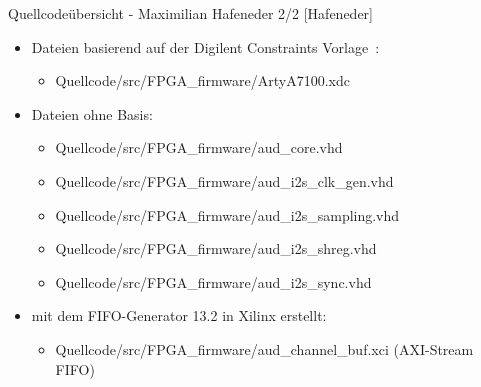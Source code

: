 \begin{frame}{Quellcodeübersicht - Maximilian Hafeneder 2/2 [Hafeneder]}
    \begin{itemize}
        \item Dateien basierend auf der Digilent Constraints Vorlage~\cite{digilent_artya7_100_constraints}:
            \begin{itemize}
                \item Quellcode/src/FPGA\_firmware/ArtyA7100.xdc
            \end{itemize}
        \item Dateien ohne Basis:
            \begin{itemize}
                \item Quellcode/src/FPGA\_firmware/aud\_core.vhd
                \item Quellcode/src/FPGA\_firmware/aud\_i2s\_clk\_gen.vhd
                \item Quellcode/src/FPGA\_firmware/aud\_i2s\_sampling.vhd
                \item Quellcode/src/FPGA\_firmware/aud\_i2s\_shreg.vhd
                \item Quellcode/src/FPGA\_firmware/aud\_i2s\_sync.vhd
            \end{itemize}
        \item mit dem FIFO-Generator 13.2 in Xilinx erstellt:
            \begin{itemize}
                \item  Quellcode/src/FPGA\_firmware/aud\_channel\_buf.xci (AXI-Stream FIFO)
            \end{itemize}
    \end{itemize}
\end{frame}
